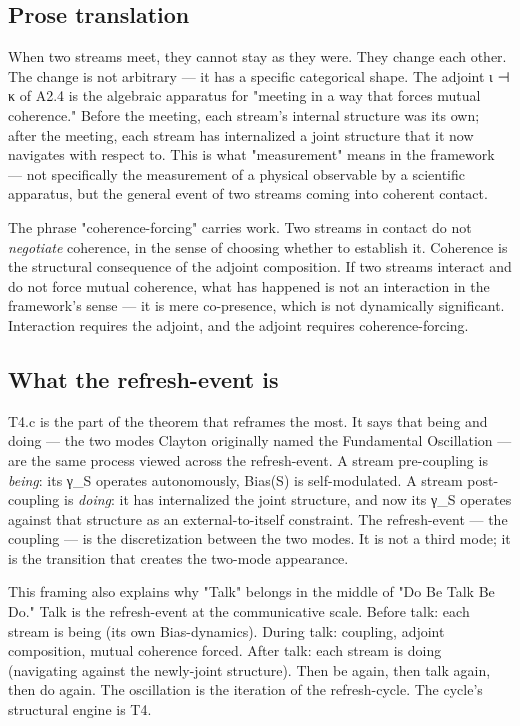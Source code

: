 \documentclass[11pt, openany]{book}
\begin{document}
\subsection{Prose translation}

When two streams meet, they cannot stay as they were. They change each other. The change is not arbitrary --- it has a specific categorical shape. The adjoint ι ⊣ κ of A2.4 is the algebraic apparatus for "meeting in a way that forces mutual coherence." Before the meeting, each stream's internal structure was its own; after the meeting, each stream has internalized a joint structure that it now navigates with respect to. This is what "measurement" means in the framework --- not specifically the measurement of a physical observable by a scientific apparatus, but the general event of two streams coming into coherent contact.

The phrase "coherence-forcing" carries work. Two streams in contact do not \textit{negotiate} coherence, in the sense of choosing whether to establish it. Coherence is the structural consequence of the adjoint composition. If two streams interact and do not force mutual coherence, what has happened is not an interaction in the framework's sense --- it is mere co-presence, which is not dynamically significant. Interaction requires the adjoint, and the adjoint requires coherence-forcing.

\subsection{What the refresh-event is}

T4.c is the part of the theorem that reframes the most. It says that being and doing --- the two modes Clayton originally named the Fundamental Oscillation --- are the same process viewed across the refresh-event. A stream pre-coupling is \textit{being}: its γ\_\allowbreak{}S operates autonomously, Bias(S) is self-modulated. A stream post-coupling is \textit{doing}: it has internalized the joint structure, and now its γ\_\allowbreak{}S operates against that structure as an external-to-itself constraint. The refresh-event --- the coupling --- is the discretization between the two modes. It is not a third mode; it is the transition that creates the two-mode appearance.

This framing also explains why "Talk" belongs in the middle of "Do Be Talk Be Do." Talk is the refresh-event at the communicative scale. Before talk: each stream is being (its own Bias-dynamics). During talk: coupling, adjoint composition, mutual coherence forced. After talk: each stream is doing (navigating against the newly-joint structure). Then be again, then talk again, then do again. The oscillation is the iteration of the refresh-cycle. The cycle's structural engine is T4.
\end{document}
